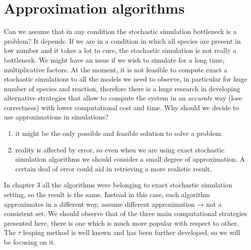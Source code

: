 \graphicspath{{chapters/04/images/}}
\chapter{Approximation algorithms}
Can we assume that in any condition the stochastic simulation bottleneck is a problem? It depends.
If we are in a condition in which all species are present in low number and it takes a lot to cure, the stochastic simulation is not really a bottleneck.
We might have an issue if we wish to simulate for a long time, multiplicative factors.
At the moment, it is not feasible to compute exact a stochastic simulations to all the models we need to observe, in particular for huge number of species and reaction, therefore there is a huge research in developing alternative strategies that allow to compute the system in an \emph{accurate} way (lose correctness) with lower computational cost and time.
Why should we decide to use approximations in simulations?

\begin{enumerate}
  \def\labelenumi{\arabic{enumi}.}
  \item it might be the only possible and feasible solution to solve a problem.
  \item reality is affected by error, so even when we are using exact stochastic simulation algorithms we should consider a small degree of approximation.
    A certain deal of error could aid in retrieving a more realistic result.
\end{enumerate}

In chapter 3 all the algorithms were belonging to exact stochastic simulation setting, so the result is the same.
Instead in this case, each algorithm approximates in a different way, assume different approximation → not a consistent set.
We should observe that of the three main computational strategies presented here, there is one which is much more popular with respect to other.
The $\tau$ leaping method is well known and has been further developed, so we will be focusing on it.

